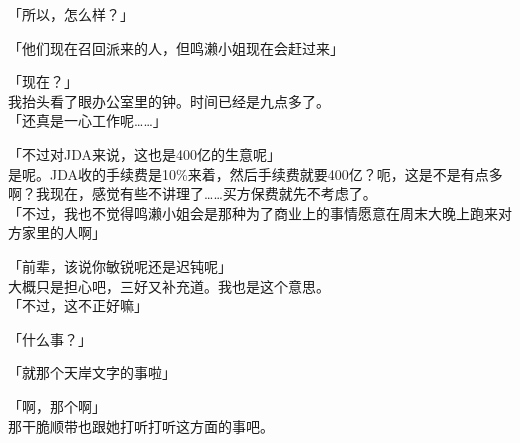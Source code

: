 「所以，怎么样？」

「他们现在召回派来的人，但鸣濑小姐现在会赶过来」

「现在？」\\

我抬头看了眼办公室里的钟。时间已经是九点多了。\\

「还真是一心工作呢……」

「不过对JDA来说，这也是400亿的生意呢」\\

是呢。JDA收的手续费是10\%来着，然后手续费就要400亿？呃，这是不是有点多啊？我现在，感觉有些不讲理了……买方保费就先不考虑了。\\

「不过，我也不觉得鸣濑小姐会是那种为了商业上的事情愿意在周末大晚上跑来对方家里的人啊」

「前辈，该说你敏锐呢还是迟钝呢」\\

大概只是担心吧，三好又补充道。我也是这个意思。\\

「不过，这不正好嘛」

「什么事？」

「就那个天岸文字的事啦」

「啊，那个啊」\\

那干脆顺带也跟她打听打听这方面的事吧。\\


